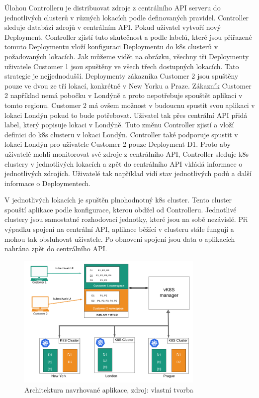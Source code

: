 Úlohou Controlleru je distribuovat zdroje z centrálního API serveru do jednotlivých clusterů v různých lokacích podle definovaných pravidel. Controller sleduje databázi zdrojů v centrálním API. Pokud uživatel vytvoří nový Deployment, Controller zjistí tuto skutečnost a podle labelů, které jsou přiřazené tomuto Deploymentu vloží konfiguraci Deploymentu do k8s clusterů v požadovaných lokacích. Jak můžeme vidět na obrázku, všechny tři Deploymenty uživatele Customer 1 jsou spuštěny ve všech třech dostupných lokacích. Tato strategie je nejjednodušší. Deploymenty zákazníka Customer 2 jsou spuštěny pouze ve dvou ze tří lokací, konkrétně v New Yorku a Praze. Zákazník Customer 2 například nemá pobočku v Londýně a proto nepotřebuje spouštět aplikaci v tomto regionu. Customer 2 má ovšem možnost v budoucnu spustit svou aplikaci v lokaci Londýn pokud to bude potřebovat. Uživatel tak přes centrální API přidá label, který popisuje lokaci v Londýně. Tuto změnu Controller zjistí a vloží definici do k8s clusteru v lokaci Londýn. Controller také podporuje spustit v lokaci Londýn pro uživatele Customer 2 pouze Deployment D1. Proto aby uživatelé mohli monitorovat své zdroje z centrálního API, Controller sleduje k8s clustery v jednotlivých lokacích a zpět do centrálního API vkládá informace o jednotlivých zdrojích. Uživatelé tak například vidí stav jednotlivých podů a další informace o Deploymentech.\par
V jednotlivých lokacích je spuštěn plnohodnotný k8s cluster. Tento cluster spouští aplikace podle konfigurace, kterou obdžel od Controlleru. Jednotlivé clustery jsou samostatné rozhodovací jednotky, které jsou na sobě nezávislé. Při výpadku spojení na centrální API, aplikace běžící v clusteru stále fungují a mohou tak obsluhovat uživatele. Po obnovení spojení jsou data o aplikacích nahrána zpět do centrálního API. 

\begin{figure}[H]
  \begin{centering}
    
	  \includegraphics[width=0.8\textwidth]{images/vk8s-architektura.png}
    \par
	  \caption{Architektura navrhované aplikace\label{fig:vk8s-architecture}, zdroj: vlastní tvorba}
    \end{centering}
\end{figure}
